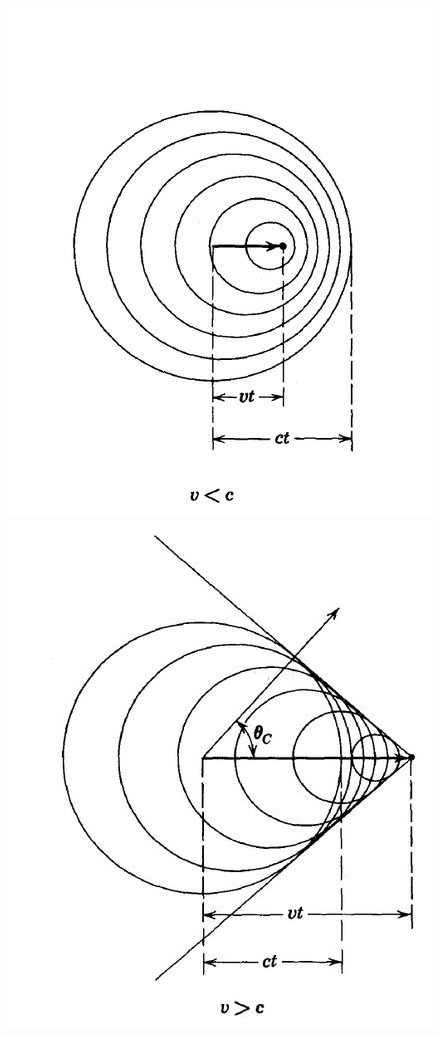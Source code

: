 \begin{marginfigure}[*-20]
    \includegraphics[width=\textwidth]{figures/icecube/cherenkov/cherenkov_slow.jpeg}
    \includegraphics[width=\textwidth]{figures/icecube/cherenkov/cherenkov_fast.jpeg}

\end{marginfigure}
